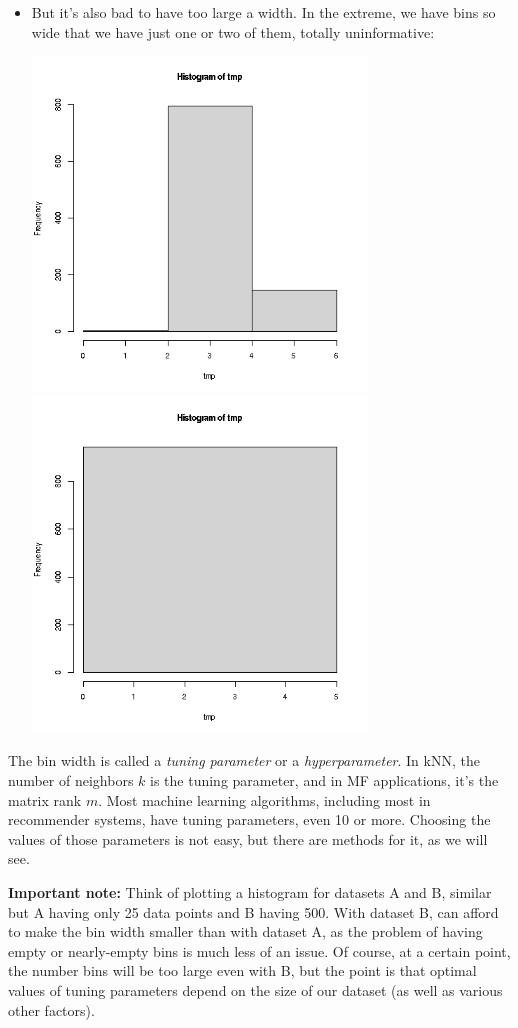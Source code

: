 \begin{itemize}
\item But it's also bad to have too large a width.  In the extreme, we
have bins so wide that we have just one or two of them, totally uninformative:

\includegraphics[width=3.5in]{Images/HistBrks2.png} 
\includegraphics[width=3.5in]{Images/HistBrks1.png} 

\end{itemize} 

The bin width is called a \textit{tuning parameter} or a
\textit{hyperparameter}.  In kNN, the number of neighbors $k$ is the
tuning parameter, and in MF applications, it's the matrix rank $m$.
Most machine learning algorithms, including most in recommender systems,
have tuning parameters, even 10 or more.  Choosing the values of those
parameters is not easy, but there are methods for it, as we will see.

\textbf{Important note:} Think of plotting a histogram for datasets A
and B, similar but A having only 25 data points and B having 500.  With
dataset B, can afford to make the bin width smaller than with dataset A,
as the problem of having empty or nearly-empty bins is much less of an
issue.  Of course, at a certain point, the number bins will be too large
even with B, but the point is that optimal values of tuning parameters
depend on the size of our dataset (as well as various other factors).

